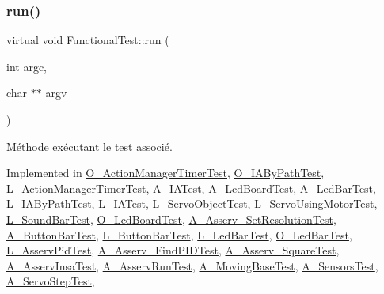 \subsubsection{\texorpdfstring{run()}{run()}}
{\footnotesize\ttfamily virtual void Functional\+Test\+::run (\begin{DoxyParamCaption}\item[{int}]{argc,  }\item[{char $\ast$$\ast$}]{argv }\end{DoxyParamCaption})\hspace{0.3cm}{\ttfamily [pure virtual]}}

Méthode exécutant le test associé. 

Implemented in \hyperlink{classO__ActionManagerTimerTest_ab88b301cdfa06385c521335dd27932c9}{O\+\_\+\+Action\+Manager\+Timer\+Test}, \hyperlink{classO__IAByPathTest_a3f57f585ff1382a52bf7f79a28d43629}{O\+\_\+\+I\+A\+By\+Path\+Test}, \hyperlink{classL__ActionManagerTimerTest_a8142442fb7b9ed2b09b48bfec2cf49e2}{L\+\_\+\+Action\+Manager\+Timer\+Test}, \hyperlink{classA__IATest_a53c1fd77a64d6a55a6386829ba6f7697}{A\+\_\+\+I\+A\+Test}, \hyperlink{classA__LcdBoardTest_ae41885fb9b4623bb4897e264b1550054}{A\+\_\+\+Lcd\+Board\+Test}, \hyperlink{classA__LedBarTest_ab90a8b6aa14e330f417f72ee5f08e00a}{A\+\_\+\+Led\+Bar\+Test}, \hyperlink{classL__IAByPathTest_af141ff239ba9f21329a1ef3a1a84a512}{L\+\_\+\+I\+A\+By\+Path\+Test}, \hyperlink{classL__IATest_adae506ab06c58655167898d93903d767}{L\+\_\+\+I\+A\+Test}, \hyperlink{classL__ServoObjectTest_adbf78503aa8a5f23673ff10bcd924a84}{L\+\_\+\+Servo\+Object\+Test}, \hyperlink{classL__ServoUsingMotorTest_a5da92b0b22c5e55b230547a2be00c940}{L\+\_\+\+Servo\+Using\+Motor\+Test}, \hyperlink{classL__SoundBarTest_ad518b52a13cf17ad327f7b96e3d3e44b}{L\+\_\+\+Sound\+Bar\+Test}, \hyperlink{classO__LcdBoardTest_a5fe507797dd1ee404d3fd4a0fd6b7885}{O\+\_\+\+Lcd\+Board\+Test}, \hyperlink{classA__Asserv__SetResolutionTest_a545e3f61effce9ada7362c956fa7b5d0}{A\+\_\+\+Asserv\+\_\+\+Set\+Resolution\+Test}, \hyperlink{classA__ButtonBarTest_a63c0ce685488028c4cf777c773d1632c}{A\+\_\+\+Button\+Bar\+Test}, \hyperlink{classL__ButtonBarTest_a8b9670eb86f11aab09cb80040b856b45}{L\+\_\+\+Button\+Bar\+Test}, \hyperlink{classL__LedBarTest_ade4267d18949f8e4150410f6a18743f8}{L\+\_\+\+Led\+Bar\+Test}, \hyperlink{classO__LedBarTest_af9e0e172d13b334cda0fe32bb659b414}{O\+\_\+\+Led\+Bar\+Test}, \hyperlink{classL__AsservPidTest_a7161b32c707082e95469394e12c2a3f8}{L\+\_\+\+Asserv\+Pid\+Test}, \hyperlink{classA__Asserv__FindPIDTest_acc445eae5445a7f0add802f1bc34851e}{A\+\_\+\+Asserv\+\_\+\+Find\+P\+I\+D\+Test}, \hyperlink{classA__Asserv__SquareTest_ac79fb82ae484354c587c6fd925c6c599}{A\+\_\+\+Asserv\+\_\+\+Square\+Test}, \hyperlink{classA__AsservInsaTest_aecdab7eb1a270927321e01a00f5faa12}{A\+\_\+\+Asserv\+Insa\+Test}, \hyperlink{classA__AsservRunTest_a333d95553c334244fa2a1d63e5eba13a}{A\+\_\+\+Asserv\+Run\+Test}, \hyperlink{classA__MovingBaseTest_a1ac04e328db4ee50ebbd7cee6bfe39ca}{A\+\_\+\+Moving\+Base\+Test}, \hyperlink{classA__SensorsTest_a862d3ed0b994946f6ac42280515b2c36}{A\+\_\+\+Sensors\+Test}, \hyperlink{classA__ServoStepTest_ad98ddd1d901a5ac0c76e4a10a7e1b46c}{A\+\_\+\+Servo\+Step\+Test}, 
